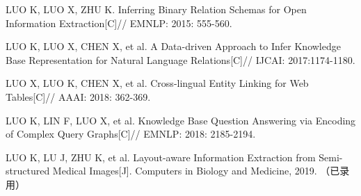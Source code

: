 
\begin{publications}{99}
    \item\textsc{LUO K, LUO X, ZHU K}. {Inferring Binary Relation Schemas for Open Information Extraction}[C]// EMNLP: 2015: 555-560.
    \item\textsc{LUO K, LUO X, CHEN X}, et al. {A Data-driven Approach to Infer Knowledge Base Representation for Natural Language Relations}[C]// IJCAI: 2017:1174-1180.
    \item\textsc{LUO X, LUO K, CHEN X}, et al. {Cross-lingual Entity Linking for Web Tables}[C]// AAAI: 2018: 362-369.
    \item\textsc{LUO K, LIN F, LUO X}, et al. {Knowledge Base Question Answering via Encoding of Complex Query Graphs}[C]// EMNLP: 2018: 2185-2194.
    \item\textsc{LUO K, LU J, ZHU K}, et al. {Layout-aware Information Extraction from Semi-structured Medical Images}[J]. Computers in Biology and Medicine, 2019. （已录用）
\end{publications}
